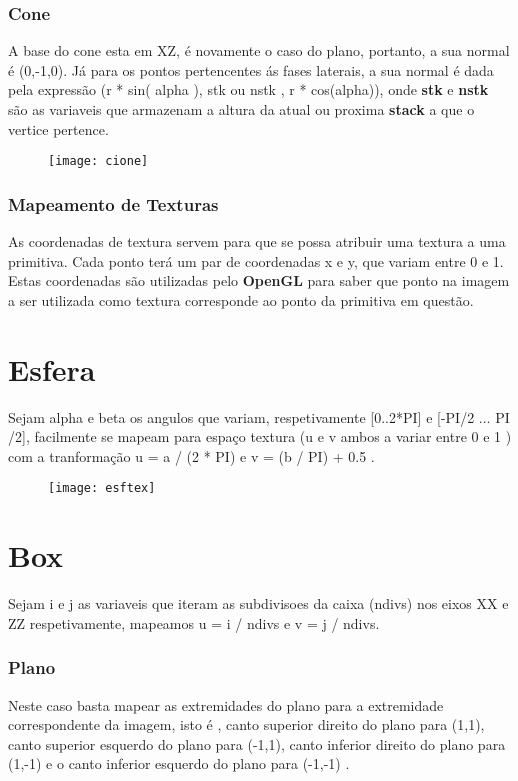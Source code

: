 \documentclass{article}
\begin{document}
\subsubsection{ Cone }
A base do cone esta em XZ, é novamente o caso do plano, portanto, a sua normal é (0,-1,0). Já para os pontos pertencentes ás fases laterais, a sua normal é dada pela expressão (r * sin( alpha ), stk ou nstk , r * cos(alpha)), onde \textbf{stk} e \textbf{nstk} são as variaveis que armazenam a altura da atual ou proxima \textbf{stack} a que o vertice pertence. 
\begin{figure}[H]
	\centering
	\texttt{[image: cione]}
\end{figure}
\newpage

\subsubsection{Mapeamento de Texturas}
As coordenadas de textura servem para que se possa atribuir uma textura a uma primitiva. Cada ponto terá um par de coordenadas x e y, que variam entre 0 e 1. Estas coordenadas são utilizadas pelo \textbf{OpenGL} para saber que ponto na imagem a ser utilizada como textura corresponde ao ponto da primitiva em questão. 

\section{ Esfera }

Sejam  alpha e beta os angulos que variam, respetivamente [0..2*PI] e [-PI/2 ... PI /2], facilmente se mapeam para espaço textura (u e v ambos a variar entre 0 e 1 ) com a tranformação u = a / (2 * PI) e v = (b / PI) + 0.5 .\\ 
\begin{figure}[H]
	\centering
	\texttt{[image: esftex]}
\end{figure}
\section{ Box }
Sejam i e j as variaveis que iteram as subdivisoes da caixa (ndivs) nos eixos XX e ZZ respetivamente, mapeamos  u =  i / ndivs e v = j / ndivs.
\subsubsection{ Plano } 
Neste caso basta mapear as extremidades do plano para a extremidade correspondente da imagem, isto é ,  canto superior direito do plano para (1,1), canto superior esquerdo do plano para (-1,1), canto inferior direito do plano para (1,-1) e o canto inferior esquerdo do plano para (-1,-1) . 
\end{document}
